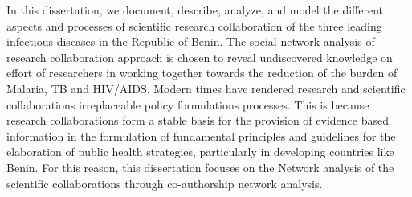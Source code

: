 In this dissertation, we document, describe, analyze, and model the different aspects and processes of scientific research collaboration of the three leading infectious diseases in the Republic of Benin. The social network analysis of research collaboration approach is chosen to reveal undiscovered knowledge on effort of researchers in working together towards the reduction of the burden of Malaria, TB and HIV/AIDS. Modern times have rendered research and scientific collaborations irreplaceable policy formulations processes. This is because research collaborations form a stable basis for the provision of evidence based information in the formulation of fundamental principles and guidelines for the elaboration of public health strategies, particularly in developing countries like Benin. For this reason, this dissertation focuses on the Network analysis of the scientific collaborations through co-authorship network analysis.

